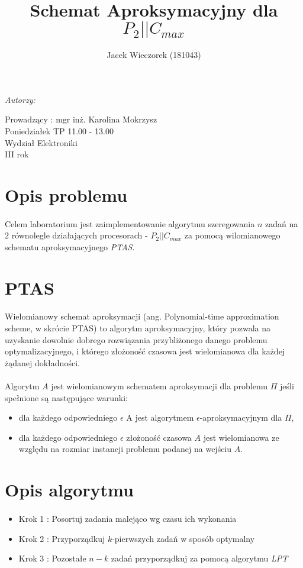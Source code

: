 \documentclass[wide,a4paper,titlepage,12pt] {article}
\title{Schemat Aproksymacyjny dla $P_{2}||C_{max}$}
\author{Jacek Wieczorek (181043)}
\makeatletter
\renewcommand{\maketitle}{
  \begin{titlepage}
    \begin{center}
      \vspace*{3cm}
      \LARGE \@title \par
      \vspace{2cm}
      \textit{\small Autorzy:}\par
      \normalsize \@author\par \normalsize
      \vspace{3cm}
      Prowadzący : mgr inż. Karolina Mokrzysz\\
      Poniedziałek TP 11.00 - 13.00\\
      \vspace{3cm}
      Wydział Elektroniki\\ III rok \par
      \vspace{3cm}
      \small \@date
    \end{center}
  \end{titlepage}
}
\makeatother
\begin{document}
  \maketitle
  \section{Opis problemu}
\paragraph{}
 Celem laboratorium jest zaimplementowanie algorytmu szeregowania $n$ zadań na $2$ równolegle działających procesorach -  $P_{2} || C_{max}$ za pomocą wilomianowego schematu aproksymacyjnego \textit{PTAS}.

\section{PTAS}
\paragraph{}
Wielomianowy schemat aproksymacji (ang. Polynomial-time approximation scheme, w skrócie PTAS) to algorytm aproksymacyjny, który pozwala na uzyskanie dowolnie dobrego rozwiązania przybliżonego danego problemu optymalizacyjnego, i którego złożoność czasowa jest wielomianowa dla każdej żądanej dokładności.

\paragraph{}
Algorytm $A$ jest wielomianowym schematem aproksymacji dla problemu $\Pi$ jeśli spełnione są następujące warunki:
\begin{itemize}
    \item dla każdego odpowiedniego $\epsilon$ A jest algorytmem $\epsilon$-aproksymacyjnym dla $\Pi$,
    \item dla każdego odpowiedniego $\epsilon$ złożoność czasowa $A$ jest wielomianowa ze względu na rozmiar instancji problemu podanej na wejściu $A$.
\end{itemize}

\section{Opis algorytmu}
\paragraph{}
\begin{itemize}
  \item Krok 1 : Posortuj zadania malejąco wg czasu ich wykonania
  \item Krok 2 : Przyporządkuj $k$-pierwszych zadań w sposób optymalny
  \item Krok 3 : Pozostałe $n-k$ zadań przyporządkuj za pomocą algorytmu \textit{LPT} 
\end{itemize}
\end{document}
